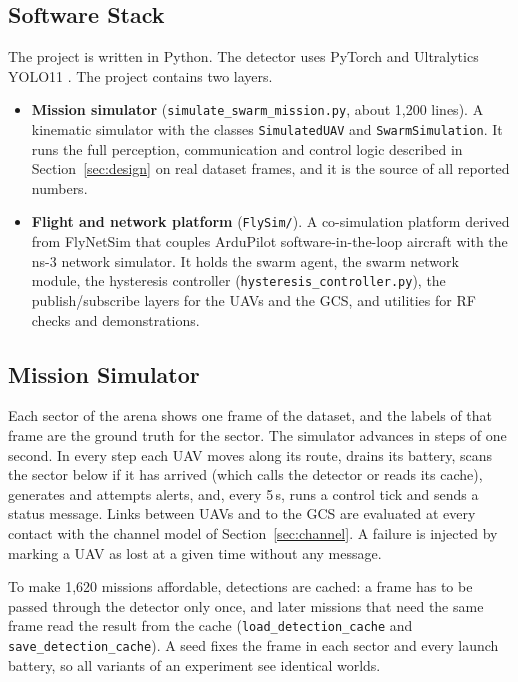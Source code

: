 \documentclass[10pt,letterpaper]{article}
\begin{document}
\subsection{Software Stack}
The project is written in Python. The detector uses PyTorch and Ultralytics YOLO11 \cite{jocher2024yolo11}. The project contains two layers.
\begin{itemize}
\item \textbf{Mission simulator} (\texttt{simulate\_swarm\_mission.py}, about 1,200 lines). A kinematic simulator with the classes \texttt{SimulatedUAV} and \texttt{SwarmSimulation}. It runs the full perception, communication and control logic described in Section~\ref{sec:design} on real dataset frames, and it is the source of all reported numbers.
\item \textbf{Flight and network platform} (\texttt{FlySim/}). A co-simulation platform derived from FlyNetSim \cite{baidya2018flynetsim} that couples ArduPilot software-in-the-loop aircraft with the ns-3 network simulator. It holds the swarm agent, the swarm network module, the hysteresis controller (\texttt{hysteresis\_controller.py}), the publish/subscribe layers for the UAVs and the GCS, and utilities for RF checks and demonstrations.
\end{itemize}

\subsection{Mission Simulator}
Each sector of the arena shows one frame of the dataset, and the labels of that frame are the ground truth for the sector. The simulator advances in steps of one second. In every step each UAV moves along its route, drains its battery, scans the sector below if it has arrived (which calls the detector or reads its cache), generates and attempts alerts, and, every 5\,s, runs a control tick and sends a status message. Links between UAVs and to the GCS are evaluated at every contact with the channel model of Section~\ref{sec:channel}. A failure is injected by marking a UAV as lost at a given time without any message.

To make 1,620 missions affordable, detections are cached: a frame has to be passed through the detector only once, and later missions that need the same frame read the result from the cache (\texttt{load\_detection\_cache} and \texttt{save\_detection\_cache}). A seed fixes the frame in each sector and every launch battery, so all variants of an experiment see identical worlds.
\end{document}
